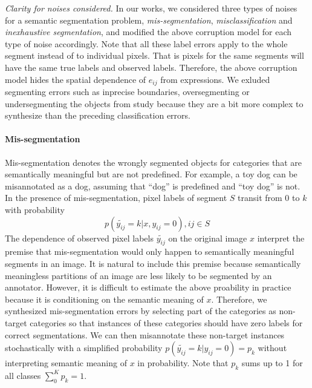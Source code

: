 \noindent \textit{Clarity for noises considered.}
In our works, we considered three types of noises for a semantic segmentation problem, \textit{mis-segmentation}, \textit{misclassification} and \textit{inexhaustive segmentation}, and modified the above corruption model for each type of noise accordingly.
Note that all these label errors apply to the whole segment instead of to individual pixels.
That is pixels for the same segments will have the same true labels and observed labels.
Therefore, the above corruption model hides the spatial dependence of $e_{ij}$ from expressions.
We exluded segmenting errors such as inprecise boundaries, oversegmenting or undersegmenting the objects from study because they are a bit more complex to synthesize than the preceding classification errors.



\paragraph{Mis-segmentation}
Mis-segmentation denotes the wrongly segmented objects for categories that are semantically meaningful but are not predefined.
For example, a toy dog can be misannotated as a dog, assuming that ``dog'' is predefined and ``toy dog'' is not.
In the presence of mis-segmentation, pixel labels of segment $S$ transit from $0$ to $k$ with probability
$$p(\tilde{y_{ij}}=k \vert x, y_{ij}=0), ij \in S $$
The dependence of observed pixel labels $\tilde{y_{ij}}$ on the original image $x$ interpret the premise that mis-segmentation would only happen to semantically meaningful segments in an image.
It is natural to include this premise because semantically meaningless partitions of an image are less likely to be segmented by an annotator.
However, it is difficult to estimate the above proability in practice because it is conditioning on the semantic meaning of $x$.
Therefore, we synthesized mis-segmentation errors by selecting part of the categories as non-target categories so that instances of these categories should have zero labels for correct segmentations.
We can then misannotate these non-target instances stochastically with a simplified probability $p(\tilde{y_{ij}}=k \vert y_{ij}=0)=p_k$ without  interpreting semantic meaning of $x$ in probability.
Note that $p_k$ sums up to 1 for all classes $\sum_0^K p_k = 1$.

